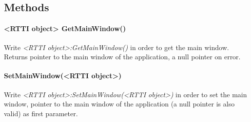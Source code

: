 \subsection{Methods}

\paragraph{<RTTI object> GetMainWindow()}
Write \emph{<RTTI object>:GetMainWindow()} in order to get the main window. Returns pointer to the main window of the application, a null pointer on error.

\paragraph{SetMainWindow(<RTTI object>)}
Write \emph{<RTTI object>:SetMainWindow(<RTTI object>)} in order to set the main window, pointer to the main window of the application (a null pointer is also valid) as first parameter.
